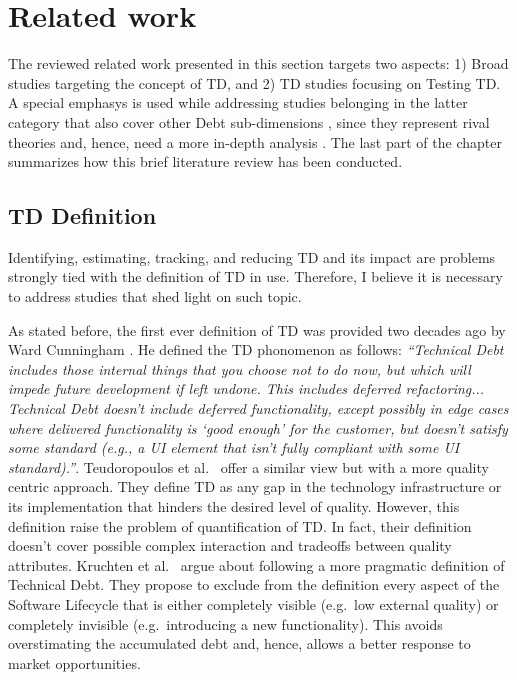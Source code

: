 \chapter{Related work}

The reviewed related work presented in this section targets two aspects: 1) Broad studies targeting the concept of TD, and 2) TD studies focusing on Testing TD. A special emphasys is used while addressing studies belonging in the latter category that also cover other Debt sub-dimensions \cite{mapping_study_td}, since they represent rival theories and, hence, need a more in-depth analysis \cite{case_study_guide}. The last part of the chapter summarizes how this brief literature review has been conducted.

\section{TD Definition} \label{td_definition}
Identifying, estimating, tracking, and reducing TD and its impact are problems strongly tied with the definition of TD in use. Therefore, I believe it is necessary to address studies that shed light on such topic.

As stated before, the first ever definition of TD was provided two decades ago by Ward Cunningham \cite{first_mention_of_TD}. He defined the TD phonomenon as follows:
\textit{“Technical Debt includes those internal things that you choose
not to do now, but which will impede future development if left
undone. This includes deferred refactoring... Technical Debt doesn't include deferred functionality, except possibly in edge cases where delivered functionality is ‘good enough’ for the customer, but doesn't satisfy some standard (e.g., a UI element that isn't fully compliant with some UI standard).”}. Teudoropoulos et al.\ \cite{td_from_stakeholder_perspective} offer a similar view but with a more quality centric approach. They define TD as any gap in the technology infrastructure or its implementation that hinders the desired level of quality. However, this definition raise the problem of quantification of TD. In fact, their definition doesn't cover possible complex interaction and tradeoffs between quality attributes. %
Kruchten et al.\ \cite{td_from_debt_to_metaphor} argue about following a more pragmatic definition of Technical Debt. They propose to exclude from the definition every aspect of the Software Lifecycle that is either completely visible (e.g.\ low external quality) or completely invisible (e.g.\ introducing a new functionality). This avoids overstimating the accumulated debt and, hence, allows a better response to market opportunities.

